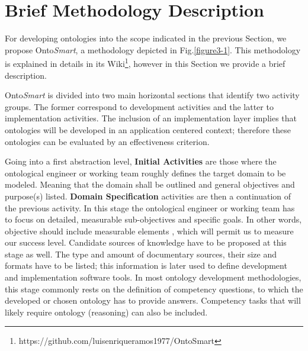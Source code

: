 \section{Brief Methodology Description}\label{methodology}

For developing ontologies into the scope indicated in the previous Section,  we propose Onto\textit{Smart}, a methodology  depicted in Fig.\ref{figure3-1}. This methodology is explained in details in its Wiki\footnote{https://github.com/luisenriqueramos1977/OntoSmart}, however in this Section we provide a brief description.

Onto\textit{Smart} is divided into two main horizontal sections that identify two activity groups. The former correspond to development activities and the latter to implementation activities. The inclusion of an implementation layer implies that ontologies will be developed in an application centered context; therefore these  ontologies can be evaluated by an effectiveness criterion.


Going into a first abstraction level, \textbf{Initial Activities} are those where the ontological engineer or working team roughly defines the target domain to be modeled. Meaning that the domain shall be outlined and general objectives and purpose(s) listed. \textbf{Domain Specification} activities are then a continuation of the previous activity. In this stage the ontological engineer or working team has to focus on detailed, measurable sub-objectives and specific goals.  In other words, objective should include measurable elements , which will permit us to measure our  success level. Candidate sources of knowledge have to be proposed at this stage as well.  The type and amount of documentary sources, their size and formats have to be listed; this information is later used to define development and implementation software tools.  In most ontology development methodologies, this stage commonly rests on the definition of competency questions, to which the developed or chosen ontology has to provide answers. Competency tasks that will likely require ontology (reasoning) can also be included. 

